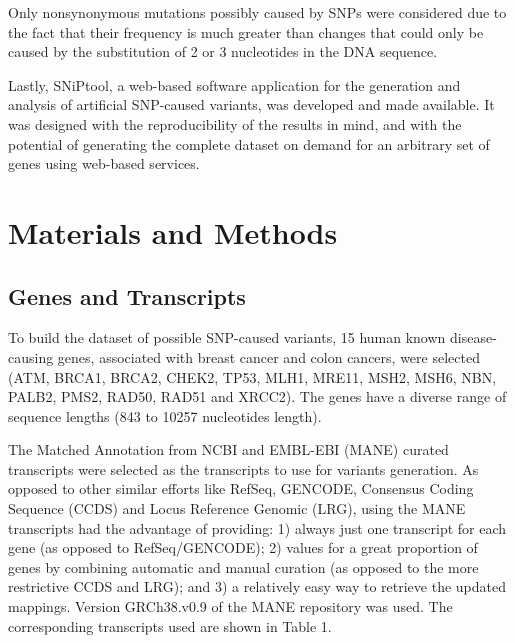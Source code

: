 \documentclass[12pt,MSc,wordcount,anon]{muthesis}
\begin{document}
\begin{flushleft}
Only nonsynonymous mutations possibly caused by SNPs were considered due to the fact that their frequency is much greater than changes that could only be caused by the substitution of 2 or 3 nucleotides in the DNA sequence.

Lastly, SNiPtool, a web-based software application for the generation and analysis of artificial SNP-caused variants, was developed and made available. It was designed with the reproducibility of the results in mind, and with the potential of generating the complete dataset on demand for an arbitrary set of genes using web-based services.


\chapter{Materials and Methods}
\label{cha:methods}

\section{Genes and Transcripts}

To build the dataset of possible SNP-caused variants, 15 human known disease-causing genes, associated with breast cancer and colon cancers, were selected (ATM, BRCA1, BRCA2, CHEK2, TP53, MLH1, MRE11, MSH2, MSH6, NBN, PALB2, PMS2, RAD50, RAD51 and XRCC2). The genes have a diverse range of sequence lengths (843 to 10257 nucleotides length).

The Matched Annotation from NCBI and EMBL-EBI (MANE) curated transcripts were selected as the transcripts to use for variants generation. As opposed to other similar efforts like RefSeq, GENCODE, Consensus Coding Sequence (CCDS) and Locus Reference Genomic (LRG), using the MANE transcripts had the advantage of providing: 1) always just one transcript for each gene (as opposed to RefSeq/GENCODE); 2) values for a great proportion of genes by combining automatic and manual curation (as opposed to the more restrictive CCDS and LRG); and 3) a relatively easy way to retrieve the updated mappings. Version GRCh38.v0.9 of the MANE repository was used. The corresponding transcripts used are shown in Table 1.


\end{flushleft}
\end{document}
